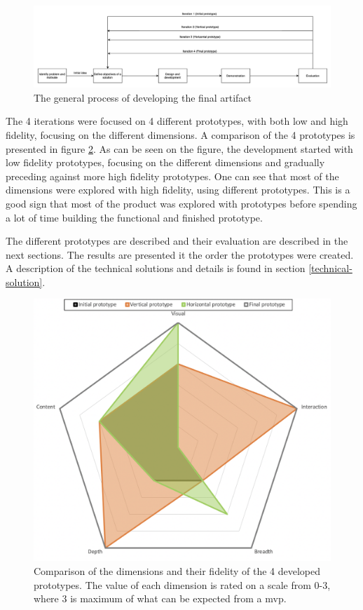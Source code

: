 \documentclass{report}
\begin{document}
\begin{figure}[h!]
    \centering
    \includegraphics[width=\linewidth]{../images/workflow.png}
    \caption{The general process of developing the final artifact}
    \label{fig:workflow}
\end{figure}

The 4 iterations were focused on 4 different prototypes, with both low and high fidelity, focusing on the different dimensions. A comparison of the 4 prototypes is presented in figure \ref{fig:radar-chart}. As can be seen on the figure, the development started with low fidelity prototypes, focusing on the different dimensions and gradually preceding against more high fidelity prototypes. One can see that most of the dimensions were explored with high fidelity, using different prototypes. This is a good sign that most of the product was explored with prototypes before spending a lot of time building the functional and finished prototype. 

The different prototypes are described and their evaluation are described in the next sections. The results are presented it the order the prototypes were created. A description of the technical solutions and details is found in section \ref{technical-solution}.

\begin{figure}[h!]
    \centering
    \includegraphics[width=\linewidth]{../images/radar-chart.png}
    \caption{Comparison of the dimensions and their fidelity of the 4 developed prototypes. The value of each dimension is rated on a scale from 0-3, where 3 is maximum of what can be expected from a \gls{mvp}.}
    \label{fig:radar-chart}
\end{figure}
\end{document}
